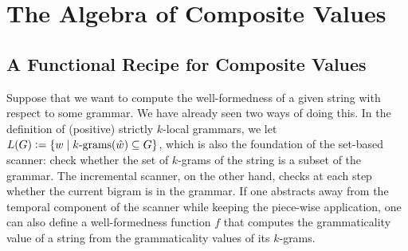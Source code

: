 \section{The Algebra of Composite Values}

\subsection{A Functional Recipe for Composite Values}

Suppose that we want to compute the well-formedness of a given string with respect to some grammar.
We have already seen two ways of doing this.
In the definition of (positive) strictly $k$-local grammars, we let $L(G) \is \setof{ w \mid \Bigrams[k](\augmented{w}) \subseteq G}$, which is also the foundation of the set-based scanner: check whether the set of $k$-grams of the string is a subset of the grammar.
The incremental scanner, on the other hand, checks at each step whether the current bigram is in the grammar.
If one abstracts away from the temporal component of the scanner while keeping the piece-wise application, one can also define a well-formedness function $f$ that computes the grammaticality value of a string from the grammaticality values of its $k$-grams.

